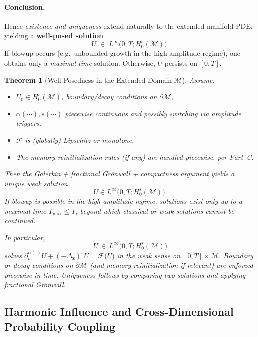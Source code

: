 \documentclass[12pt]{article}
\newtheorem{theorem}{Theorem}[section]
\begin{document}
\paragraph{Conclusion.}
Hence \emph{existence and uniqueness} extend naturally to the extended manifold PDE, 
yielding a \textbf{well-posed solution} 
\[
U \;\in\; L^\infty\bigl(0,T;H_0^s(\mathcal{M})\bigr).
\]
If blowup occurs (e.g.\ unbounded growth in the high-amplitude regime), one obtains only a 
\emph{maximal time} solution. Otherwise, $U$ persists on $[0,T]$.

\begin{theorem}[Well-Posedness in the Extended Domain \(\mathcal{M}\)]
\label{thm:ExtendedWellPosed}
Assume:
\begin{itemize}
  \item $U_0\in H_0^s(\mathcal{M})$, boundary/decay conditions on $\partial\mathcal{M}$,
  \item $\alpha(\cdots), s(\cdots)$ piecewise continuous and possibly switching via amplitude triggers,
  \item $\mathcal{F}$ is (globally) Lipschitz or monotone,
  \item The memory reinitialization rules (if any) are handled piecewise, per Part~C.
\end{itemize}
Then the Galerkin + fractional Grönwall + compactness argument 
yields a unique weak solution 
\[
U\in L^\infty\bigl(0,T;H_0^s(\mathcal{M})\bigr).
\]
\emph{If blowup is possible in the high-amplitude regime}, solutions exist only up to 
a maximal time $T_{\mathrm{max}}\le T$, beyond which classical or weak solutions cannot 
be continued.

In particular, 
\[
U \,\in\, L^\infty\bigl(0,T;H_0^s(\mathcal{M})\bigr)
\]
solves 
\(\partial_t^{\alpha(\cdot)} U + (-\Delta_{\mathbf{z}})^s U = \mathcal{F}\bigl(U\bigr)\) 
\emph{in the weak sense} on \([0,T]\times \mathcal{M}\).  
Boundary or decay conditions on \(\partial\mathcal{M}\) (and memory reinitialization 
if relevant) are enforced piecewise in time. 
Uniqueness follows by comparing two solutions and applying fractional Grönwall.

\end{theorem}

\subsection{Harmonic Influence and Cross-Dimensional Probability Coupling}
\label{sec:harmonic-lowerdim}
\end{document}
